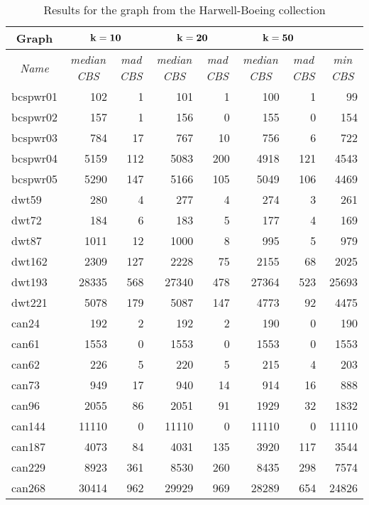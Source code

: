 \documentclass{scrartcl}
\theoremstyle{plain}
\newcommand{\cbs}{CBS}
\begin{document}
\begin{table}[!ht]
	\centering
	\scriptsize
	\begin{tabular}{|l|rr|rr|rr|r|}
	\hline
\multicolumn{1}{|c|}{\textbf{Graph}} & 

\multicolumn{2}{c|}{$\bf{k=10}$} & 
\multicolumn{2}{c|}{$\bf{k=20}$} &  
\multicolumn{2}{c|}{$\bf{k=50}$} & \\ 
\hline	

\multicolumn{1}{|c|}{\emph{Name}} &

\multicolumn{1}{c}{\emph{median \cbs{}}} & 
\multicolumn{1}{c|}{\emph{mad \cbs{}}} &

\multicolumn{1}{c}{\emph{median \cbs{}}} & 
\multicolumn{1}{c|}{\emph{mad \cbs{}}} &

\multicolumn{1}{c}{\emph{median \cbs{}}} & 
\multicolumn{1}{c|}{\emph{mad \cbs{}}} &

\multicolumn{1}{c|}{\emph{min \cbs{}}}

\\ \hline

\makeatletter{}bcspwr01 & 102 & 1 & 101 & 1 & 100 & 1 & 99 \\ 
bcspwr02 & 157 & 1 & 156 & 0 & 155 & 0 & 154 \\ 
bcspwr03 & 784 & 17 & 767 & 10 & 756 & 6 & 722 \\ 
bcspwr04 & 5159 & 112 & 5083 & 200 & 4918 & 121 & 4543 \\ 
bcspwr05 & 5290 & 147 & 5166 & 105 & 5049 & 106 & 4469 \\ 
dwt59 & 280 & 4 & 277 & 4 & 274 & 3 & 261 \\ 
dwt72 & 184 & 6 & 183 & 5 & 177 & 4 & 169 \\ 
dwt87 & 1011 & 12 & 1000 & 8 & 995 & 5 & 979 \\ 
dwt162 & 2309 & 127 & 2228 & 75 & 2155 & 68 & 2025 \\ 
dwt193 & 28335 & 568 & 27340 & 478 & 27364 & 523 & 25693 \\ 
dwt221 & 5078 & 179 & 5087 & 147 & 4773 & 92 & 4475 \\ 
can24 & 192 & 2 & 192 & 2 & 190 & 0 & 190 \\ 
can61 & 1553 & 0 & 1553 & 0 & 1553 & 0 & 1553 \\ 
can62 & 226 & 5 & 220 & 5 & 215 & 4 & 203 \\ 
can73 & 949 & 17 & 940 & 14 & 914 & 16 & 888 \\ 
can96 & 2055 & 86 & 2051 & 91 & 1929 & 32 & 1832 \\ 
can144 & 11110 & 0 & 11110 & 0 & 11110 & 0 & 11110 \\ 
can187 & 4073 & 84 & 4031 & 135 & 3920 & 117 & 3544 \\ 
can229 & 8923 & 361 & 8530 & 260 & 8435 & 298 & 7574 \\ 
can268 & 30414 & 962 & 29929 & 969 & 28289 & 654 & 24826 \\ 
 

\hline
\end{tabular}


	\caption{\label{tab:harwell_sto}Results for the graph from the 
Harwell-Boeing collection}
\end{table}
\end{document}
